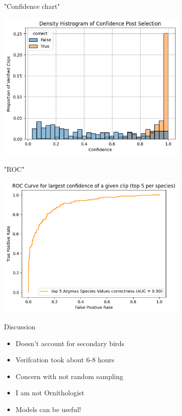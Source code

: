 \begin{frame}{"Confidence chart"}

    \centering
    \includegraphics[height=0.7\textheight,width=0.7\textwidth,keepaspectratio]{./images/prop_confidence_facet.png}

\end{frame}

\begin{frame}{"ROC"}

    \centering
    \includegraphics[height=0.7\textheight,width=0.7\textwidth,keepaspectratio]{./images/roc.png}

\end{frame}

\begin{frame}{Discussion}
    \begin{itemize}
        \item Doesn't account for secondary birds
        \item Verifcation took about 6-8 hours
        \item Concern with not random sampling
        \item I am not Ornithologist
        \item Models can be useful!
    \end{itemize}
\end{frame}

